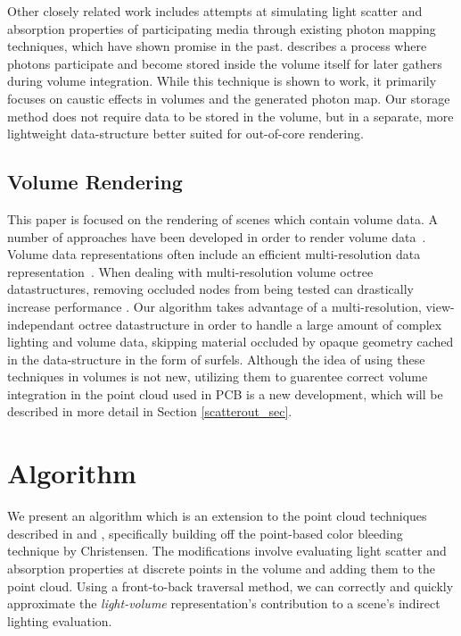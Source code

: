 \documentclass[runningheads]{llncs}
\begin{document}
Other closely related work includes attempts at simulating light scatter and absorption properties of participating media through existing photon mapping techniques, which have shown promise in the past.  \cite{jensen:1998} describes a process where photons participate and become stored inside the volume itself for later gathers during volume integration.  While this technique is shown to work, it primarily focuses on caustic effects in volumes and the generated photon map.  Our storage method does not require data to be stored in the volume, but in a separate, more lightweight data-structure better suited for out-of-core rendering.

\subsection{Volume Rendering}
This paper is focused on the rendering of scenes which contain volume data.  A number of approaches have been developed in order to render volume data~\cite{levoy88}\cite{Kajiya84}.  Volume data representations often include an efficient multi-resolution data representation~\cite{Westermann94}\cite{Levoy90}.  When dealing with multi-resolution volume octree datastructures, removing occluded nodes from being tested can drastically increase performance \cite{guthe}.  Our algorithm takes advantage of a multi-resolution, view-independant octree datastructure in order to handle a large amount of complex lighting and volume data, skipping material occluded by opaque geometry cached in the data-structure in the form of surfels.  Although the idea of using these techniques in volumes is not new, utilizing them to guarentee correct volume integration in the point cloud used in PCB is a new development, which will be described in more detail in Section \ref{scatterout_sec}.

\section{Algorithm}
\label{algorithm_sec}
We present an algorithm which is an extension to the point cloud techniques described in \cite{tabellion} and \cite{christensen:2008}, specifically building off the point-based color bleeding technique by Christensen.  The modifications involve evaluating light scatter and absorption properties at discrete points in the volume and adding them to the point cloud.  Using a front-to-back traversal method, we can correctly and quickly approximate the \textit{light-volume} representation's contribution to a scene's indirect lighting evaluation.
\end{document}
